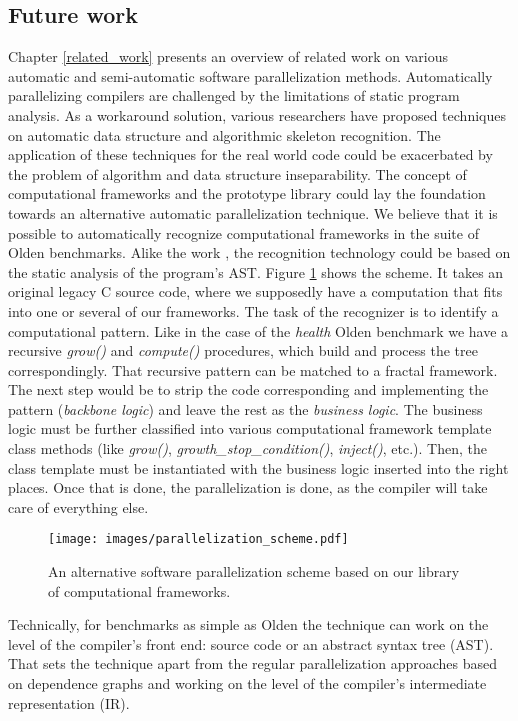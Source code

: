 \subsection{Future work}
\label{frameworks_fw}
\quad Chapter \ref{related_work} presents an overview of related work on various automatic and semi-automatic software parallelization methods. Automatically parallelizing compilers are challenged by the limitations of static program analysis. As a workaround solution, various researchers have proposed techniques on automatic data structure and algorithmic skeleton recognition. The application of these techniques for the real world code could be exacerbated by the problem of algorithm and data structure inseparability.\newline\null
\quad The concept of computational frameworks and the prototype library could lay the foundation towards an alternative automatic parallelization technique. We believe that it is possible to automatically recognize computational frameworks in the suite of Olden benchmarks. Alike the work \cite{skeletons-static}, the recognition technology could be based on the static analysis of the program's AST. Figure \ref{fig:parallelization_scheme} shows the scheme. It takes an original legacy C source code, where we supposedly have a computation that fits into one or several of our frameworks. The task of the recognizer is to identify a computational pattern. Like in the case of the \textit{health} Olden benchmark we have a recursive \textit{grow()} and \textit{compute()} procedures, which build and process the tree correspondingly. That recursive pattern can be matched to a fractal framework. The next step would be to strip the code corresponding and implementing the pattern (\textit{backbone logic}) and leave the rest as the \textit{business logic}. The business logic must be further classified into various computational framework template class methods (like \textit{grow()}, \textit{growth\_stop\_condition()}, \textit{inject()}, etc.). Then, the class template must be instantiated with the business logic inserted into the right places. Once that is done, the parallelization is done, as the compiler will take care of everything else.
\begin{figure}[!htb]
\texttt{[image: images/parallelization\_scheme.pdf]}
\caption{An alternative software parallelization scheme based on our library of computational frameworks.}
\label{fig:parallelization_scheme}
\end{figure}\newline\null
\quad Technically, for benchmarks as simple as Olden the technique can work on the level of the compiler's front end: source code or an abstract syntax tree (AST). That sets the technique apart from the regular parallelization approaches based on dependence graphs and working on the level of the compiler's intermediate representation (IR).


